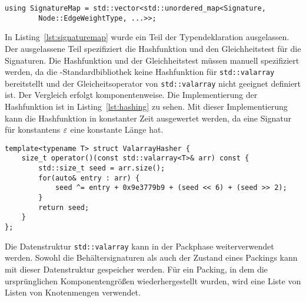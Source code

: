 \begin{lstlisting}[caption={Definition von \texttt{SignatureMap}}, label={lst:signaturemap}]
    using SignatureMap = std::vector<std::unordered_map<Signature, 
        Node::EdgeWeightType, ...>>;
\end{lstlisting}

In Listing~\ref{lst:signaturemap} wurde ein Teil der Typendeklaration ausgelassen.
Der ausgelassene Teil spezifiziert die Hashfunktion und den Gleichheitstest für die Signaturen.
Die Hashfunktion und der Gleichheitstest müssen manuell spezifiziert werden, da die \Cpp{}\hyp Standardbibliothek keine Hashfunktion für \texttt{std::valarray} bereitstellt und der Gleicheitsoperator von \texttt{std::valarray} nicht geeignet definiert ist.
Der Vergleich erfolgt komponentenweise.
Die Implementierung der Hashfunktion ist in Listing~\ref{lst:hashing} zu sehen.
Mit dieser Implementierung kann die Hashfunktion in konstanter Zeit ausgewertet werden, da eine Signatur für konstantens $\varepsilon$ eine konstante Länge hat.

\begin{lstlisting}[float, floatplacement=h, caption={Hashing mit \texttt{ValarrayHasher}}, label={lst:hashing}]
template<typename T> struct ValarrayHasher {
    size_t operator()(const std::valarray<T>& arr) const {
		std::size_t seed = arr.size();
		for(auto& entry : arr) {
			seed ^= entry + 0x9e3779b9 + (seed << 6) + (seed >> 2);
		}
		return seed;
	}
};
\end{lstlisting}

Die Datenstruktur \texttt{std::valarray} kann in der Packphase weiterverwendet werden.
Sowohl die Behältersignaturen als auch der Zustand eines Packings kann mit dieser Datenstruktur gespeicher werden.
Für ein Packing, in dem die ursprünglichen Komponentengrößen wiederhergestellt wurden, wird eine Liste von Listen von Knotenmengen verwendet.

